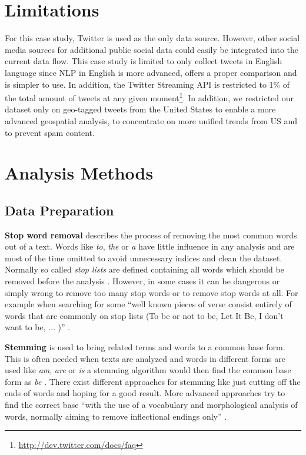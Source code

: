 \section{Limitations}
\label{sec:setup}
For this case study, Twitter is used as the only data source. However, other social media sources for additional public social data could easily be integrated into the current data flow. This case study is limited to only collect tweets in English language since NLP in English is more advanced, offers a proper comparison and is simpler to use. In addition, the Twitter Streaming API is restricted to 1\% of the total amount of tweets at any given moment\footnote{\url{http://dev.twitter.com/docs/faq} \accessednote}. In addition, we restricted our dataset only on geo-tagged tweets from the United States to enable a more advanced geospatial analysis, to concentrate on more unified trends from US and to prevent spam content.

\section{Analysis Methods}
\label{sec:analysis-methods}

\subsection{Data Preparation}
\label{subsec:data-preparation}

\textbf{Stop word removal} describes the process of removing the most common words out of a text. Words like \textit{to}, \textit{the} or \textit{a} have little influence in any analysis and are most of the time omitted to avoid unnecessary indices and clean the dataset. Normally so called \textit{stop lists} are defined containing all words which should be removed before the analysis \cite[27]{manning2008introduction}. However, in some cases it can be dangerous or simply wrong to remove too many stop words or to remove stop words at all. For example when searching for some \enquote{well known pieces of verse consist entirely of words that are commonly on stop lists (To be or not to be, Let It Be, I don’t want to be, ... )} \cite[27]{manning2008introduction}.

\textbf{Stemming} is used to bring related terms and words to a common base form. This is often needed when texts are analyzed and words in different forms are used like \textit{am}, \textit{are} or \textit{is} a stemming algorithm would then find the common base form as \textit{be} \cite[32]{manning2008introduction}. There exist different approaches for stemming like just cutting off the ends of words and hoping for a good result. More advanced approaches try to find the correct base \enquote{with the use of a vocabulary and morphological analysis of words, normally aiming to remove inflectional endings only} \cite[32]{manning2008introduction}.

